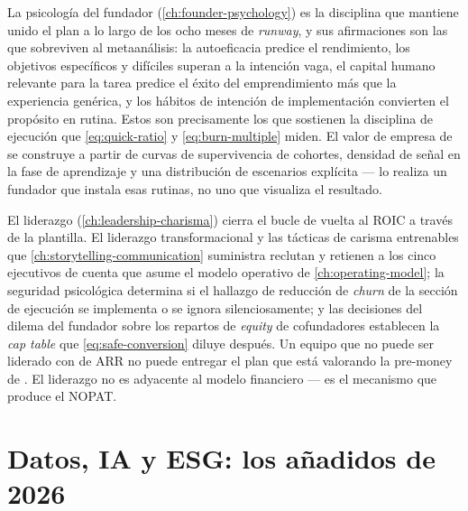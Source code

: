 La psicología del fundador (\cref{ch:founder-psychology}) es la disciplina que mantiene unido
el plan a lo largo de los ocho meses de \emph{runway}, y sus afirmaciones son las que sobreviven
al metaanálisis: la autoeficacia predice el rendimiento, los objetivos específicos y difíciles
superan a la intención vaga, el capital humano relevante para la tarea predice el éxito del
emprendimiento más que la experiencia genérica, y los hábitos de intención de implementación
convierten el propósito en rutina. Estos son precisamente los que sostienen la disciplina de
ejecución que \cref{eq:quick-ratio} y \cref{eq:burn-multiple} miden. El valor de empresa de
 se construye a partir de curvas de supervivencia de cohortes, densidad de señal
en la fase de aprendizaje y una distribución de escenarios explícita --- lo realiza un fundador
que instala esas rutinas, no uno que visualiza el resultado.

El liderazgo (\cref{ch:leadership-charisma}) cierra el bucle de vuelta al ROIC a través de la
plantilla. El liderazgo transformacional y las tácticas de carisma entrenables que
\cref{ch:storytelling-communication} suministra reclutan y retienen a los cinco ejecutivos de
cuenta que asume el modelo operativo de \cref{ch:operating-model}; la seguridad psicológica
determina si el hallazgo de reducción de \emph{churn} de la sección de ejecución se implementa
o se ignora silenciosamente; y las decisiones del dilema del fundador sobre los repartos de
\emph{equity} de cofundadores establecen la \emph{cap table} que \cref{eq:safe-conversion} diluye
después. Un equipo que no puede ser liderado con  de ARR no puede entregar el
plan que está valorando la pre-money de . El liderazgo no es adyacente al
modelo financiero --- es el mecanismo que produce el NOPAT.

\section{Datos, IA y ESG: los añadidos de 2026}\label{sec:capstone-new}

